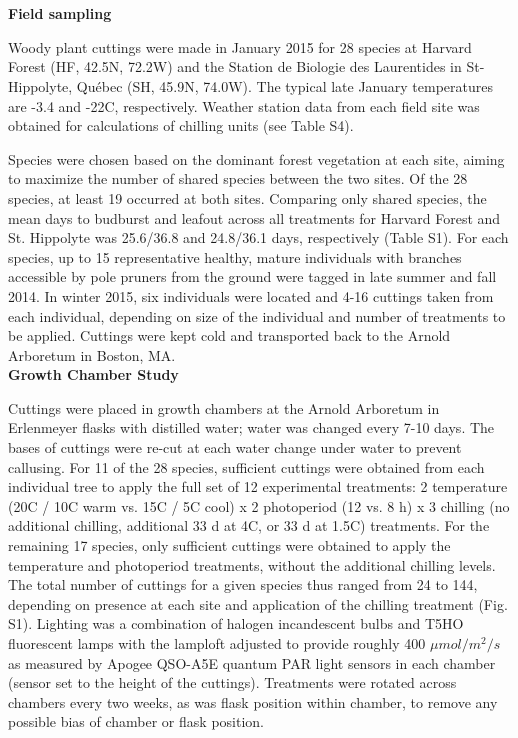 \documentclass[11pt]{article}
\begin{document}
\vspace{2ex}\\
\vspace{2ex}\\
\noindent \textbf{Field sampling}

\noindent Woody plant cuttings were made in January 2015 for 28 species at Harvard Forest (HF, 42.5\degree N, 72.2\degree W) and the Station de Biologie des Laurentides in St-Hippolyte, Qu\'ebec (SH, 45.9\degree N, 74.0\degree W). The typical late January temperatures are -3.4 and -22\degree C, respectively. Weather station data from each field site was obtained for calculations of chilling units (see Table S4). %

Species were chosen based on the dominant forest vegetation at each site, aiming to maximize the number of shared species between the two sites. Of the 28 species, at least 19 occurred at both sites. Comparing only shared species, the mean days to budburst and leafout across all treatments for Harvard Forest and St. Hippolyte was 25.6/36.8 and 24.8/36.1 days, respectively (Table S1). For each species, up to 15 representative healthy, mature individuals with branches accessible by pole pruners from the ground were tagged in late summer and fall 2014. In winter 2015, six individuals were located and 4-16 cuttings taken from each individual, depending on size of the individual and number of treatments to be applied. Cuttings were kept cold and transported back to the Arnold Arboretum in Boston, MA.
\vspace{1ex}\\
\noindent \textbf{Growth Chamber Study}

\noindent Cuttings were placed in growth chambers at the Arnold Arboretum in Erlenmeyer flasks with distilled water; water was changed every 7-10 days. The bases of cuttings were re-cut at each water change under water to prevent callusing. For 11 of the 28 species, sufficient cuttings were obtained from each individual tree to apply the full set of 12 experimental treatments: 2 temperature (20\degree C / 10\degree C warm vs. 15\degree C / 5\degree C cool) x 2 photoperiod (12 vs. 8 h) x 3 chilling (no additional chilling, additional 33 d at 4\degree C, or 33 d at 1.5\degree C) treatments. For the remaining 17 species, only sufficient cuttings were obtained to apply the temperature and photoperiod treatments, without the additional chilling levels. The total number of cuttings for a given species thus ranged from 24 to 144, depending on presence at each site and application of the chilling treatment (Fig. S1). Lighting was a combination of halogen incandescent bulbs and T5HO fluorescent lamps with the lamploft adjusted to provide roughly 400 $\mu mol/m^{2}/s$ as measured by Apogee QSO-A5E quantum PAR light sensors in each chamber (sensor set to the height of the cuttings). Treatments were rotated across chambers every two weeks, as was flask position within chamber, to remove any possible bias of chamber or flask position.
\end{document}
